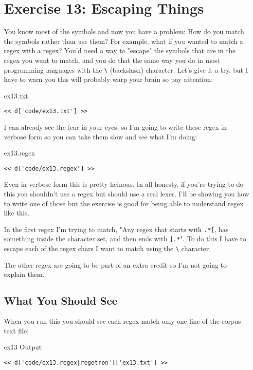 \chapter{Exercise 13: Escaping Things}

You know most of the symbols and now you have a problem:  How do you match
the symbols rather than use them?  For example, what if you wanted to match a
regex with a regex?  You'd need a way to "escape" the symbols that are in the
regex you want to match, and you do that the same way you do in most
programming languages with the \verb|\| (backslash) character.  Let's give
it a try, but I have to warn you this will probably warp your brain so pay
attention:

\begin{code}{ex13.txt}
\begin{Verbatim}
<< d['code/ex13.txt'] >>
\end{Verbatim}
\end{code}

I can already see the fear in your eyes, so I'm going to write these regex
in verbose form so you can take them slow and see what I'm doing:

\begin{code}{ex13.regex}
\begin{Verbatim}
<< d['code/ex13.regex'] >>
\end{Verbatim}
\end{code}

Even in verbose form this is pretty heinous.  In all honesty, if you're
trying to do this you shouldn't use a regex but should use a real lexer.
I'll be showing you how to write one of those but the exercise is good for
being able to understand regex like this.

In the first regex I'm trying to match, "Any regex that starts with \verb|.*[|,
has something inside the character set, and then ends with \verb|].*|".  To do
this I have to escape each of the regex chars I want to match using the \verb|\|
character.

The other regex are going to be part of an extra credit so I'm not going to
explain them.

\section{What You Should See}

When you run this you should see each regex match only one line of the corpus
text file:

\begin{code}{ex13 Output}
\begin{Verbatim}
<< d['code/ex13.regex|regetron']['ex13.txt'] >>
\end{Verbatim}
\end{code}

